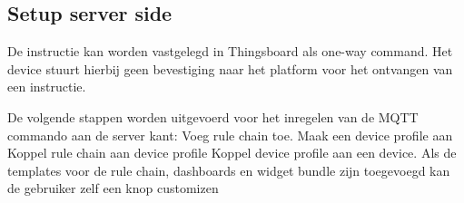 		
		\subsection{Setup server side}
		De instructie kan worden vastgelegd in Thingsboard als one-way command. Het device stuurt hierbij geen bevestiging naar het platform voor het ontvangen van een instructie.
		
		De volgende stappen worden uitgevoerd voor het inregelen van de MQTT commando aan de server kant:
		Voeg rule chain toe.
		Maak een device profile aan
		Koppel rule chain aan device profile
		Koppel device profile aan een device.
		Als de templates voor de rule chain, dashboards en widget bundle zijn toegevoegd kan de gebruiker zelf een knop customizen
		
		
		\begin{center}
		\end{center}
		
		
		
		\begin{center}
		\end{center}
		
		
		
		\begin{center}
		\end{center}
		
		
		
		\begin{center}
		\end{center}
		
		
		
		\begin{center}
		\end{center}
		
		
		\begin{center}
		\end{center}
		
		
		
		\begin{center}
		\end{center}
		
